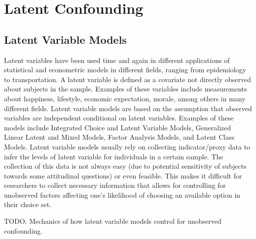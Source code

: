 \section{Latent Confounding}

\subsection{Latent Variable Models}

Latent variables have been used time and again in different applications of statistical 
and econometric models in different fields, ranging from epidemiology to transportation.
A latent variable is defined as a covariate not directly observed about subjects in the sample.
Examples of these variables include measurements about happiness, lifestyle, economic expectation, 
morale, among others in many different fields.
Latent variable models are based on the assumption that observed variables are independent 
conditional on latent variables.
Examples of these models include Integrated Choice and Latent Variable Models, Generalized Linear Latent and Mixed Models, Factor Analysis Models, and Latent Class Models.
Latent variable models usually rely on collecting indicator/proxy data to infer the levels of latent variable for individuals in a certain sample.
The collection of this data is not always easy (due to potential sensitivity of subjects towards some attitudinal questions)
or even feasible. 
This makes it difficult for researchers to collect necessary information that allows
for controlling for unobserved factors affecting one's likelihood of choosing an available option in their choice set.

TODO: Mechanics of how latent variable models control for unobserved confounding.
